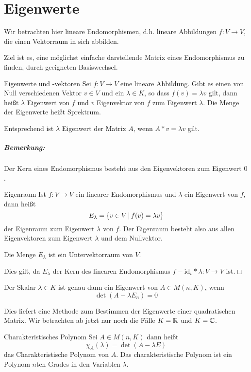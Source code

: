 \chapter{Eigenwerte}
Wir betrachten hier lineare Endomorphismen, d.h. lineare Abbildungen $f:V\rightarrow V$, die einen Vektorraum in sich abbilden.

Ziel ist es, eine möglichst einfache darstellende Matrix eines Endomorphismus zu finden, durch geeigneten Basiswechsel.

\begin{definition}{Eigenwerte und -vektoren}
	Sei $f:V\rightarrow V$ eine lineare Abbildung. Gibt es einen von Null verschiedenen Vektor $v\in V$ und ein $\lambda\in K$, so dass $f(v)=\lambda v$ gilt, dann heißt $\lambda$ Eigenwert von $f$ und $v$ Eigenvektor von $f$ zum Eigenwert $\lambda$. Die Menge der Eigenwerte heißt Sprektrum.
\end{definition}
Entsprechend ist $\lambda$ Eigenwert der Matrix $A$, wenn $A*v=\lambda v$ gilt.

\paragraph{Bemerkung:} Der Kern eines Endomorphismus besteht aus den Eigenvektoren zum Eigenwert $0$.

\begin{definition}{Eigenraum}
	Ist $f:V\rightarrow V$ ein linearer Endomorphismus und $\lambda$ ein Eigenwert von $f$, dann heißt
	\begin{equation*}
		E_\lambda=\left\{ v\in V \,\middle|\, f(v)=\lambda v \right\}
	\end{equation*}
	der Eigenraum zum Eigenwert $\lambda$ von $f$. Der Eigenraum besteht also aus allen Eigenvektoren zum Eigenwert $\lambda$ und dem Nullvektor.
\end{definition}
\begin{lemma}{}
	Die Menge $E_\lambda$ ist ein Untervektorraum von $V$.
\end{lemma}
\beweis
Dies gilt, da $E_\lambda$ der Kern des linearen Endomorphismus $f-\mathrm{id}_v*\lambda:V\rightarrow V$ ist.\hfill$\Box$

\begin{satz}{}
	Der Skalar $\lambda \in K$ ist genau dann ein Eigenwert von $A\in M(n,K)$, wenn
	\begin{equation*}
		\det(A-\lambda E_n)=0
	\end{equation*}
\end{satz}
Dies liefert eine Methode zum Bestimmen der Eigenwerte einer quadratischen Matrix. Wir betrachten ab jetzt nur noch die Fälle $K=\mathbb{R}$ und $K=\mathbb{C}$.
\begin{definition}{Charakteristisches Polynom}
	Sei $A\in M(n,K)$ dann heißt
	\begin{equation*}
		\chi_A(\lambda)=\det(A-\lambda E)
	\end{equation*}
	das Charakteristische Polynom von $A$. Das charakteristische Polynom ist ein Polynom $n$ten Grades in den Variablen $\lambda$.
\end{definition}
